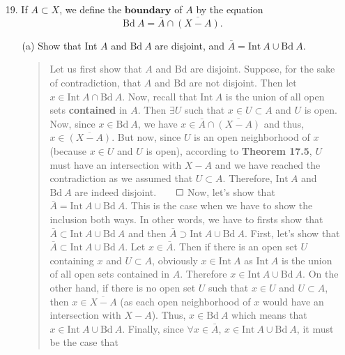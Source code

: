\documentclass[12pt, a4paper]{article}
\begin{document}
\begin{itemize}
\item[19.]
If $A \subset X$, we define the $\textbf{boundary}$ of $A$ by the equation
$$\mbox{Bd} \ A = \bar{A} \cap \overline{(X - A)}.$$
\begin{itemize}
\item[(a)]
Show that Int $A$ and $\mbox{Bd} \ A$ are disjoint, and $\bar{A} = \mbox{Int} \ A \cup \mbox{Bd} \ A$.
\begin{quote}
Let us first show that $A$ and $\mbox{Bd}$ are disjoint.
\newline
\newline
Suppose, for the sake of contradiction, that $A$ and $\mbox{Bd}$ are not disjoint.
Then let $x \in \mbox{Int} \ A \cap \mbox{Bd} \ A$. Now, recall that $\mbox{Int} \ A$
is the union of all open sets \textbf{contained} in $A$. Then $\exists U$ such
that $x \in U \subset A$ and $U$ is open. Now, since $x \in \mbox{Bd} \ A$,
we have $x \in \bar{A} \cap \overline{(X - A)}$ and thus, $x \in \overline{(X - A)}$.
But now, since $U$ is an open neighborhood of $x$ (because $x \in U$ and $U$ is open),
according to \textbf{Theorem 17.5}, $U$ must have an intersection with $X - A$ and we have
reached the contradiction as we assumed that $U \subset A$. Therefore, 
$\mbox{Int} \ A$ and $\mbox{Bd} \ A$ are indeed disjoint.$\qed$
\newline
\newline
Now, let's show that $\bar{A} = \mbox{Int} \ A \cup \mbox{Bd} \ A$.
\newline
\newline
This is the case when we have to show the inclusion both ways.
In other words, we have to firsts show that $\bar{A} \subset \mbox{Int} \ A \cup \mbox{Bd} \ A$
and then $\bar{A} \supset \mbox{Int} \ A \cup \mbox{Bd} \ A$.
\newline
\newline
First, let's show that $\bar{A} \subset \mbox{Int} \ A \cup \mbox{Bd} \ A$.
Let $x \in \bar{A}$. Then if there is an open set $U$ containing $x$ and $U \subset A$, obviously
$x \in \mbox{Int} \ A$ as $\mbox{Int} \ A$ is the union of all open sets contained in $A$. Therefore $x \in \mbox{Int} \ A \cup \mbox{Bd} \ A$.
On the other hand, if there is no open set $U$ such that $x \in U$ and $U \subset A$,
then $x \in \overline{X - A}$ (as each open neighborhood of $x$ would have an intersection with $X - A$).
Thus, $x \in \mbox{Bd} \ A$ which means that $x \in \mbox{Int} \ A \cup \mbox{Bd} \ A$.
Finally, since $\forall x \in \bar{A}$, $x \in \mbox{Int} \ A \cup \mbox{Bd} \ A$, it must be the case that

\end{quote}
\end{itemize}
\end{itemize}
\end{document}
